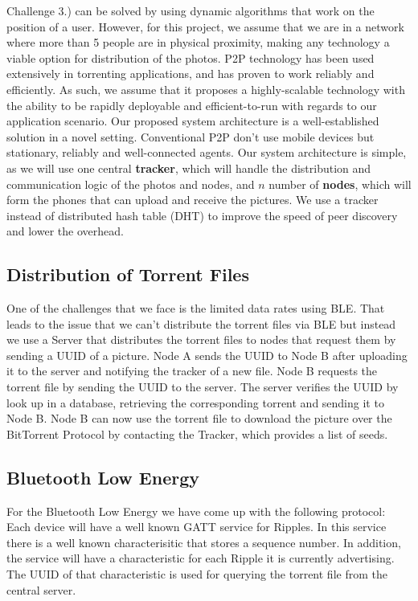 \documentclass{report}
\begin{document}
Challenge 3.) can  be solved by using dynamic algorithms that work on the position of a user. 
However, for this project, we assume that we are in a network where more than 5 people are in physical proximity, making any technology a viable option for distribution of the photos.
\newline
P2P technology has been used extensively in torrenting applications, and has proven to work reliably and efficiently. 
As such, we assume that it proposes a highly-scalable technology with the ability to be rapidly deployable and efficient-to-run with regards to our application scenario.
Our proposed system architecture is a well-established solution in a novel setting.
Conventional P2P don't use mobile devices but stationary, reliably and well-connected agents. 
Our system architecture is simple, as we will use one central \textbf{tracker}, which will handle the distribution and communication logic of the photos and nodes, and $ n $ number of \textbf{nodes}, which will form the phones that can upload and receive the pictures.
We use a tracker instead of distributed hash table (DHT) to improve the speed of peer discovery and lower the overhead.

\subsection{Distribution of Torrent Files}
One of the challenges that we face is the limited data rates using BLE.
That leads to the issue that we can't distribute the torrent files via BLE but instead we use a Server that distributes the torrent files to nodes that request them by sending a UUID of a picture. \newline
Node A sends the UUID to Node B after uploading it to the server and notifying the tracker of a new file. 
Node B requests the torrent file by sending the UUID to the server.
The server verifies the UUID by look up in a database, retrieving the corresponding torrent and sending it to Node B. Node B can now use the torrent file to download the picture over the BitTorrent Protocol by contacting the Tracker, which provides a list of seeds.

\subsection{Bluetooth Low Energy}
For the Bluetooth Low Energy we have come up with the following protocol: 
Each device will have a well known GATT service for Ripples. In this service there is a well known characterisitic that stores a sequence number. In addition, the service will have a characteristic for each Ripple it is currently advertising. The UUID of that characteristic is used for querying the torrent file from the central server.
\end{document}
